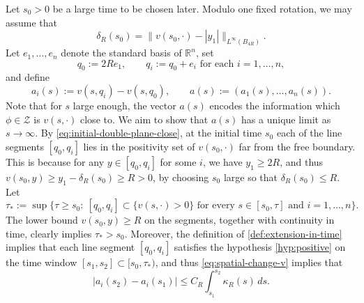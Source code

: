 \documentclass[11pt]{article}
\numberwithin{equation}{section}
\theoremstyle{definition}
\begin{document}
Let $s_0 >0$ be a large time to be chosen later. Modulo one fixed rotation, 
we may assume that
\begin{equation}\label{eq:initial-double-plane-close}
    \delta_R(s_0) = \|v(s_0,\cdot)-|y_1|\|_{L^\infty(B_{4R})}.
\end{equation}
Let \(e_1,\ldots,e_n\) denote the standard basis of $\mathbb{R}^n$, set
\begin{equation*}
    q_0:=2Re_1,\qquad q_i:=q_0+e_i \text{ for each } i=1,\ldots,n,
\end{equation*}
and define
\begin{equation*}
    a_i(s):=v(s,q_i)-v(s,q_0),\qquad
    a(s):=(a_1(s),\ldots,a_n(s)).
\end{equation*}
Note that for $s$ large enough, the vector $a(s)$ encodes the information  which $\phi\in \mathcal{Z}$ is $v(s,\cdot)$ close to. We aim to show that $a(s)$ has a unique limit as $s\to \infty$.
By \eqref{eq:initial-double-plane-close}, at the initial time $s_0$ each of the line segments $[q_0,q_i]$ lies in the positivity set of $v(s_0,\cdot)$ far from the free boundary. This is because for any \(y\in [q_0,q_i]\) for some \(i\), we have \(y_1\geq 2R\), and thus $v(s_0,y)\geq y_1-\delta_R(s_0) \geq R > 0$, by choosing $s_0$ large so that $\delta_R(s_0) \leq R$.
Let
\begin{equation}\label{def:extension-in-time}
    \tau_*:=\sup\{\tau \geq s_0:\ [q_0,q_i]\subset\{v(s,\cdot)>0\}
    \text{ for every }s\in[s_0,\tau]\text{ and }i=1,\ldots,n\}.
\end{equation}
The lower bound \(v(s_0,y)\geq R\) on the segments, together with continuity in time, clearly implies \(\tau_*>s_0\). Moreover, the definition of \eqref{def:extension-in-time} implies that each line segment $[q_0,q_i]$ satisfies the hypothesis \eqref{hyp:positive} on the time window $ [s_1,s_2] \subset [s_0,\tau_*)$, and thus \eqref{eq:spatial-change-v} implies that
\begin{equation}\label{eq:change-in-ai}
    |a_i(s_2 ) - a_i(s_1)| \leq C_R \int_{s_1}^{s_2} \kappa_R(s) \, ds. 
\end{equation} 
\end{document}
